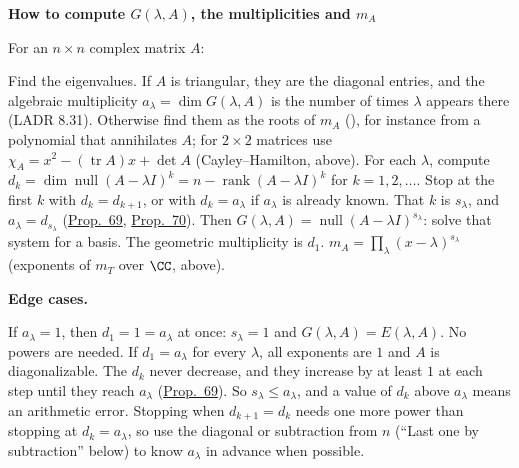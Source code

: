 \documentclass[10pt]{scrartcl}
\DeclareMathOperator{\tr}{tr}\DeclareMathOperator{\nul}{null}\DeclareMathOperator{\range}{range}\DeclareMathOperator{\spn}{span}
\newenvironment{methodbox}[1]{\begin{mdframed}[style=mdbluebox,linecolor=NavyBlue,backgroundcolor=NavyBlue!3]\textbf{\color{NavyBlue}#1}\par\vspace{2pt}}{\end{mdframed}}
\begin{document}
\begin{methodbox}{How to compute $G(\lambda,A)$, the multiplicities and $m_A$}
For an $n\times n$ complex matrix $A$:
\begin{enumerate}[label=\arabic*.,leftmargin=1.5em,itemsep=2pt,topsep=2pt]
  \ii Find the eigenvalues. If $A$ is triangular, they are the diagonal entries, and the algebraic multiplicity $a_\lambda=\dim G(\lambda,A)$ is the number of times $\lambda$ appears there (LADR 8.31). Otherwise find them as the roots of $m_A$ (), for instance from a polynomial that annihilates $A$; for $2\times2$ matrices use $\chi_A=x^2-(\tr A)x+\det A$ (Cayley--Hamilton, above).
  \ii For each $\lambda$, compute $d_k=\dim\nul(A-\lambda I)^k=n-\operatorname{rank}(A-\lambda I)^k$ for $k=1,2,\dots$. Stop at the first $k$ with $d_k=d_{k+1}$, or with $d_k=a_\lambda$ if $a_\lambda$ is already known. That $k$ is $s_\lambda$, and $a_\lambda=d_{s_\lambda}$ (\hyperref[prop-69]{Prop.~69}, \hyperref[prop-70]{Prop.~70}).
  \ii Then $G(\lambda,A)=\nul(A-\lambda I)^{s_\lambda}$: solve that system for a basis. The geometric multiplicity is $d_1$.
  \ii $m_A=\prod_\lambda(x-\lambda)^{s_\lambda}$ (exponents of $m_T$ over $\CC$, above).
\end{enumerate}
\textbf{Edge cases.}
\begin{itemize}
  \ii If $a_\lambda=1$, then $d_1=1=a_\lambda$ at once: $s_\lambda=1$ and $G(\lambda,A)=E(\lambda,A)$. No powers are needed.
  \ii If $d_1=a_\lambda$ for every $\lambda$, all exponents are $1$ and $A$ is diagonalizable.
  \ii The $d_k$ never decrease, and they increase by at least $1$ at each step until they reach $a_\lambda$ (\hyperref[prop-69]{Prop.~69}). So $s_\lambda\le a_\lambda$, and a value of $d_k$ above $a_\lambda$ means an arithmetic error.
  \ii Stopping when $d_{k+1}=d_k$ needs one more power than stopping at $d_k=a_\lambda$, so use the diagonal or subtraction from $n$ (``Last one by subtraction'' below) to know $a_\lambda$ in advance when possible.
\end{itemize}
\end{methodbox}
\end{document}
